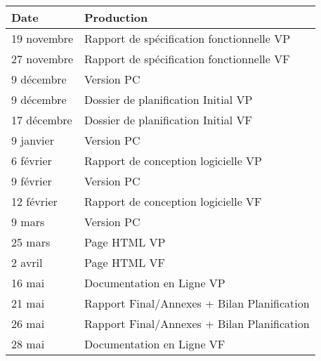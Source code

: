 \begin{tabular}{|l|l|}
\hline
  Date &
  Production \\
\hline
  19 novembre &
  Rapport de spécification fonctionnelle VP \\
\hline
  27 novembre &
  Rapport de spécification fonctionnelle VF \\
\hline
  9 décembre &
  Version PC \textnumero1 \\
\hline
  9 décembre &
  Dossier de planification Initial VP \\
\hline
  17 décembre &
  Dossier de planification Initial VF \\
\hline
  9 janvier &
  Version PC \textnumero2 \\
\hline
  6 février &
  Rapport de conception logicielle VP \\
\hline
  9 février &
  Version PC \textnumero3 \\
\hline
  12 février &
  Rapport de conception logicielle VF \\
\hline
  9 mars &
  Version PC \textnumero4 \\
\hline
  25 mars &
  Page HTML VP \\
\hline
  2 avril &
  Page HTML VF \\
\hline
  16 mai &
  Documentation en Ligne VP \\
\hline
  21 mai &
  Rapport Final/Annexes + Bilan Planification \\
\hline
  26 mai &
  Rapport Final/Annexes + Bilan Planification \\
\hline
  28 mai &
  Documentation en Ligne VF \\
\hline
\end{tabular}

